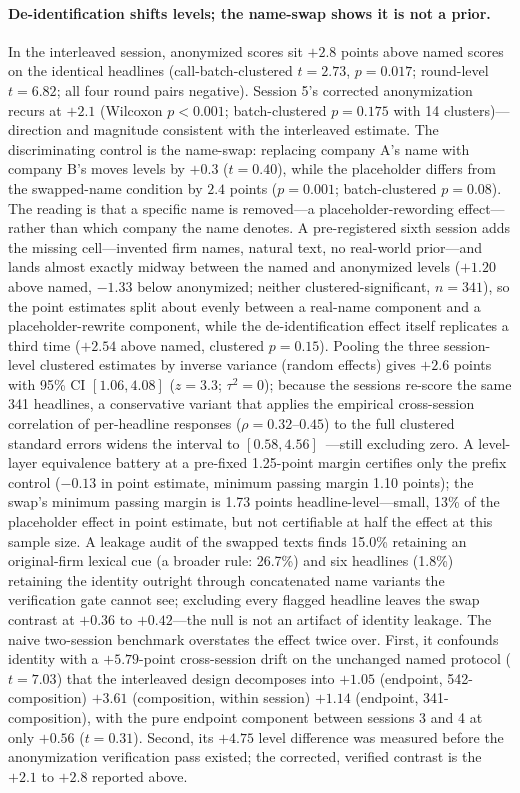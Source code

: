 \documentclass[11pt]{article}
\begin{document}
\paragraph{De-identification shifts levels; the name-swap shows it is not a prior.}
In the interleaved session, anonymized scores sit $+2.8$ points above named scores on the identical headlines (call-batch-clustered $t=2.73$, $p=0.017$; round-level $t=6.82$; all four round pairs negative). Session 5's corrected anonymization recurs at $+2.1$ (Wilcoxon $p<0.001$; batch-clustered $p=0.175$ with 14 clusters)---direction and magnitude consistent with the interleaved estimate. The discriminating control is the name-swap: replacing company A's name with company B's moves levels by $+0.3$ ($t=0.40$), while the placeholder differs from the swapped-name condition by $2.4$ points ($p=0.001$; batch-clustered $p=0.08$). The reading is that a specific name is removed---a placeholder-rewording effect---rather than which company the name denotes. A pre-registered sixth session adds the missing cell---invented firm names, natural text, no real-world prior---and lands almost exactly midway between the named and anonymized levels ($+1.20$ above named, $-1.33$ below anonymized; neither clustered-significant, $n=341$), so the point estimates split about evenly between a real-name component and a placeholder-rewrite component, while the de-identification effect itself replicates a third time ($+2.54$ above named, clustered $p=0.15$). Pooling the three session-level clustered estimates by inverse variance (random effects) gives $+2.6$ points with 95\% CI $[1.06, 4.08]$ ($z=3.3$; $\tau^2=0$); because the sessions re-score the same 341 headlines, a conservative variant that applies the empirical cross-session correlation of per-headline responses ($\rho=0.32$--$0.45$) to the full clustered standard errors widens the interval to $[0.58, 4.56]$~---still excluding zero. A level-layer equivalence battery at a pre-fixed 1.25-point margin certifies only the prefix control ($-0.13$ in point estimate, minimum passing margin 1.10 points); the swap's minimum passing margin is 1.73 points headline-level---small, 13\% of the placeholder effect in point estimate, but not certifiable at half the effect at this sample size. A leakage audit of the swapped texts finds 15.0\% retaining an original-firm lexical cue (a broader rule: 26.7\%) and six headlines (1.8\%) retaining the identity outright through concatenated name variants the verification gate cannot see; excluding every flagged headline leaves the swap contrast at $+0.36$ to $+0.42$---the null is not an artifact of identity leakage. The naive two-session benchmark overstates the effect twice over. First, it confounds identity with a $+5.79$-point cross-session drift on the unchanged named protocol ($t=7.03$) that the interleaved design decomposes into $+1.05$ (endpoint, 542-composition) $+3.61$ (composition, within session) $+1.14$ (endpoint, 341-composition), with the pure endpoint component between sessions 3 and 4 at only $+0.56$ ($t=0.31$). Second, its $+4.75$ level difference was measured before the anonymization verification pass existed; the corrected, verified contrast is the $+2.1$ to $+2.8$ reported above.
\end{document}
